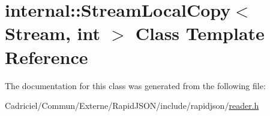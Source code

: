 \hypertarget{classinternal_1_1_stream_local_copy}{}\section{internal\+:\+:Stream\+Local\+Copy$<$ Stream, int $>$ Class Template Reference}
\label{classinternal_1_1_stream_local_copy}


The documentation for this class was generated from the following file\+:\begin{DoxyCompactItemize}
\item 
Cadriciel/\+Commun/\+Externe/\+Rapid\+J\+S\+O\+N/include/rapidjson/\hyperlink{reader_8h}{reader.\+h}\end{DoxyCompactItemize}
